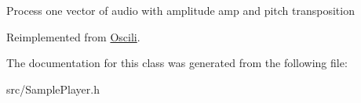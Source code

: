 Process one vector of audio with amplitude amp and pitch transposition 

Reimplemented from \hyperlink{class_oscili_a053ace3b633b645c4b8a517009ea7389}{Oscili}.



The documentation for this class was generated from the following file\+:\begin{DoxyCompactItemize}
\item 
src/Sample\+Player.\+h\end{DoxyCompactItemize}
